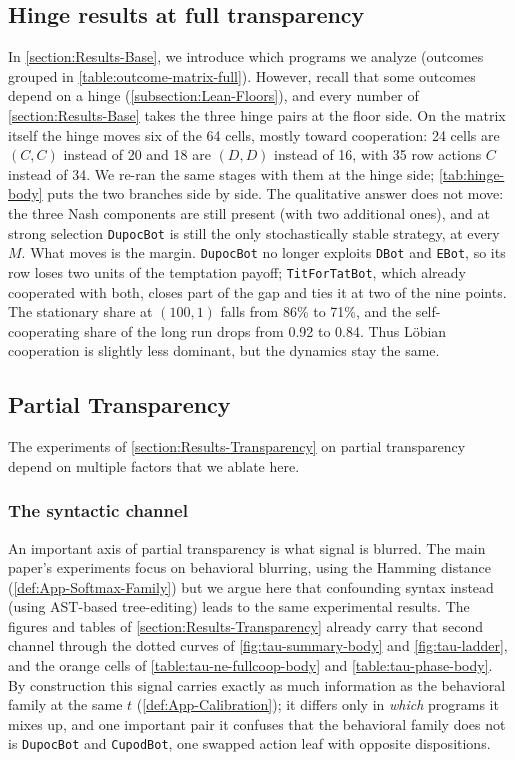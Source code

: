 \documentclass[twoside,11pt]{article}
\begin{document}
\subsection{Hinge results at full transparency}
\label{apx-subsection:Experiments-BaseBots-Hinge}



In \cref{section:Results-Base}, we introduce which programs we analyze (outcomes grouped in \cref{table:outcome-matrix-full}). However, recall that some outcomes depend on a hinge (\cref{subsection:Lean-Floors}), and every number of \cref{section:Results-Base} takes the three hinge pairs at the floor side. On the matrix itself the hinge moves six of the 64 cells, mostly toward cooperation: 24 cells are $(C,C)$ instead of 20 and 18 are $(D,D)$ instead of 16, with 35 row actions $C$ instead of 34. We re-ran the same stages with them at the hinge side; \cref{tab:hinge-body} puts the two branches side by side. The qualitative answer does not move: the three Nash components are still present (with two additional ones), and at strong selection \texttt{DupocBot} is still the only stochastically stable strategy, at every $M$. What moves is the margin. \texttt{DupocBot} no longer exploits \texttt{DBot} and \texttt{EBot}, so its row loses two units of the temptation payoff; \texttt{TitForTatBot}, which already cooperated with both, closes part of the gap and ties it at two of the nine points. The stationary share at $(100, 1)$ falls from 86\% to 71\%, and the self-cooperating share of the long run drops from 0.92 to 0.84. Thus Löbian cooperation is slightly less dominant, but the dynamics stay the same.



\subsection{Partial Transparency}
The experiments of \cref{section:Results-Transparency} on partial transparency depend on multiple factors that we ablate here.

\subsubsection{The syntactic channel}
\label{apx-subsubsection:Experiments-Transparency-Channels}
An important axis of partial transparency is what signal is blurred. The main paper's experiments focus on behavioral blurring, using the Hamming distance (\cref{def:App-Softmax-Family}) but we argue here that confounding syntax instead (using AST-based tree-editing) leads to the same experimental results. The figures and tables of \cref{section:Results-Transparency} already carry that second channel through the dotted curves of \cref{fig:tau-summary-body} and \cref{fig:tau-ladder}, and the orange cells of \cref{table:tau-ne-fullcoop-body} and \cref{table:tau-phase-body}. By construction this signal carries exactly as much information as the behavioral family at the same $t$ (\cref{def:App-Calibration}); it differs only in \emph{which} programs it mixes up, and one important pair it confuses that the behavioral family does not is \texttt{DupocBot} and \texttt{CupodBot}, one swapped action leaf with opposite dispositions.
\end{document}

